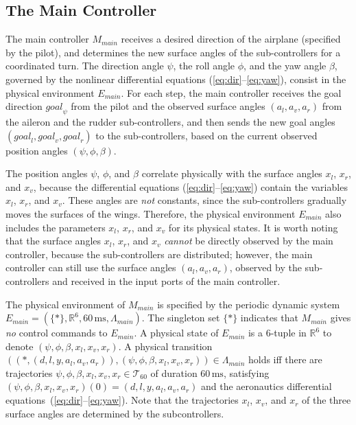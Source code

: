 \documentclass{sig-alternate}
\begin{document}
\subsection{The Main Controller}

The main controller $M_\mathit{main}$ receives 
a desired direction of the airplane (specified by the pilot),
and determines the new surface angles of the sub-controllers
for a coordinated turn. 
%
The direction angle $\psi$, the roll angle $\phi$, and the yaw angle $\beta$,
governed by the nonlinear differential equations (\ref{eq:dir}--\ref{eq:yaw}),
consist in the physical environment $E_\mathit{main}$.
For each step, the main controller receives the goal direction
$\mathit{goal}_\psi$ from the pilot 
and the observed surface angles $(a_l, a_v, a_r)$
from the aileron and the rudder sub-controllers,
and then sends the new goal angles 
$(\mathit{goal}_l, \mathit{goal}_v, \mathit{goal}_r)$ to the sub-controllers,
based on the current observed position angles $(\psi, \phi, \beta)$.


The position angles $\psi$, $\phi$, and $\beta$ correlate
physically with the surface angles $x_l$, $x_r$, and $x_v$,
because the differential equations (\ref{eq:dir}--\ref{eq:yaw}) contain 
the variables $x_l$, $x_r$, and $x_v$.
These angles are \emph{not} constants,
since the sub-controllers gradually  moves the surfaces of the wings.
Therefore, the physical environment $E_\mathit{main}$
also includes the parameters $x_l$, $x_r$, and $x_v$
for its physical states.
It is worth noting that the surface angles $x_l$, $x_r$, and $x_v$
\emph{cannot} be directly observed by the main controller, 
because the sub-controllers are distributed;
however, the main controller can still use the surface angles $(a_l, a_v, a_r)$,
observed by the sub-controllers and received in the input ports of the main controller.
 
The physical environment of $M_\mathit{main}$
is specified by the periodic dynamic system
$E_\mathit{main} = (\{\ast\}, \mathbb{R}^6, 60\,\mathrm{ms}, \Lambda_{\mathit{main}})$.
The singleton set $\{\ast\}$ indicates 
that $M_\mathit{main}$ gives \emph{no} control commands to $E_\mathit{main}$.
A physical state of $E_\mathit{main}$
is a $6$-tuple in $\mathbb{R}^6$ 
to denote $(\psi,  \phi, \beta, x_l, x_v, x_r)$.
A physical transition
$((\ast, (d,  l, y, a_l, a_v, a_r)), (\psi,  \phi, \beta, x_l, x_v, x_r)) \in \Lambda_{\mathit{main}}$
holds
iff there are trajectories $\psi,  \phi, \beta, x_l, x_v, x_r \in \mathcal{T}_{60}$
of duration $60\,\mathrm{ms}$,
satisfying 
$(\psi,  \phi, \beta, x_l, x_v, x_r)(0) = (d,  l, y, a_l, a_v, a_r)$
and
the aeronautics 
differential equations~(\ref{eq:dir}--\ref{eq:yaw}). 
Note that 
the trajectories $x_l$, $x_v$, and $x_r$ of the three surface angles 
are determined by the subcontrollers.
\end{document}
